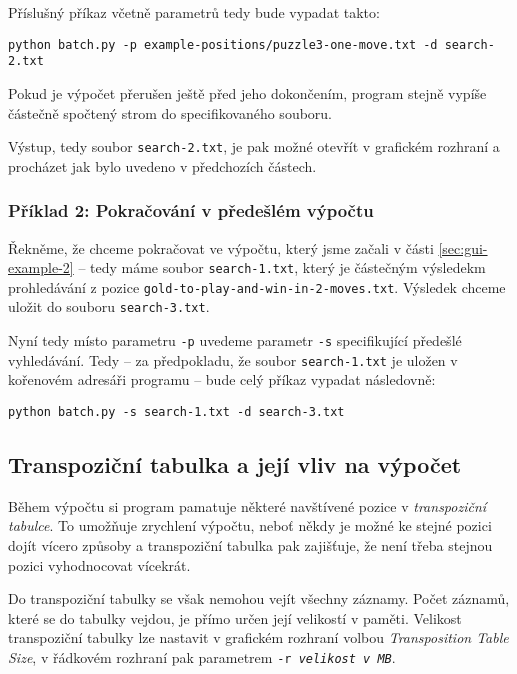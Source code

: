 \documentclass{article}
\begin{document}
Příslušný příkaz včetně parametrů tedy bude vypadat takto:
\begin{center}\verb+python batch.py -p example-positions/puzzle3-one-move.txt -d search-2.txt+\end{center}

Pokud je výpočet přerušen ještě před jeho dokončením, program stejně vypíše částečně spočtený strom do specifikovaného
souboru.

Výstup, tedy soubor \texttt{search-2.txt}, je pak možné otevřít v grafickém rozhraní a procházet jak bylo uvedeno v
předchozích částech.

\subsubsection{Příklad 2: Pokračování v předešlém výpočtu}
Řekněme, že chceme pokračovat ve výpočtu, který jsme začali v části \ref{sec:gui-example-2} -- tedy máme soubor
\texttt{search-1.txt}, který je částečným výsledekm prohledávání z pozice \texttt{gold-to-play-and-win-in-2-moves.txt}.
Výsledek chceme uložit do souboru \texttt{search-3.txt}.

Nyní tedy místo parametru \texttt{-p} uvedeme parametr \texttt{-s} specifikující předešlé vyhledávání. Tedy -- za
předpokladu, že soubor \texttt{search-1.txt} je uložen v kořenovém adresáři programu -- bude celý příkaz vypadat
následovně:
\begin{center}\verb+python batch.py -s search-1.txt -d search-3.txt+\end{center}

\subsection{Transpoziční tabulka a její vliv na výpočet}
Během výpočtu si program pamatuje některé navštívené pozice v \emph{transpoziční tabulce}. To umožňuje zrychlení
výpočtu, neboť někdy je možné ke stejné pozici dojít vícero způsoby a transpoziční tabulka pak zajišťuje, že není třeba
stejnou pozici vyhodnocovat vícekrát.

Do transpoziční tabulky se však nemohou vejít všechny záznamy. Počet záznamů, které se do tabulky vejdou, je přímo určen
její velikostí v paměti. Velikost transpoziční tabulky lze nastavit v grafickém rozhraní volbou \emph{Transposition
Table Size}, v řádkovém rozhraní pak parametrem \texttt{-r \textit{velikost v MB}}.
\end{document}
